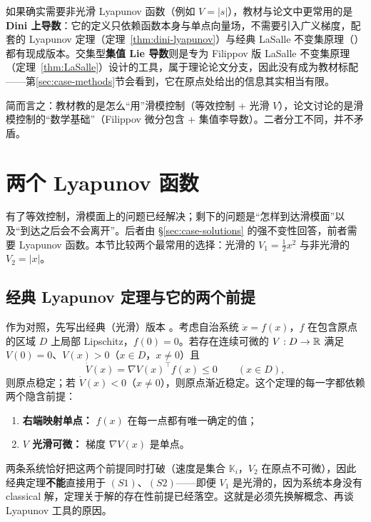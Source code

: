 如果确实需要非光滑 Lyapunov 函数（例如 $V=|s|$），教材与论文中更常用的是 \textbf{Dini 上导数}：它的定义只依赖函数本身与单点向量场，不需要引入广义梯度，配套的 Lyapunov 定理（定理~\ref{thm:dini-lyapunov}）与经典 LaSalle 不变集原理（\cite{roucheStabilityTheoryLiapunov1977}）都有现成版本。交集型\textbf{集值 Lie 导数}则是专为 Filippov 版 LaSalle 不变集原理（定理~\ref{thm:LaSalle}）设计的工具，属于理论论文分支，因此没有成为教材标配——第\ref{sec:case-methods}节会看到，它在原点处给出的信息其实相当有限。

简而言之：教材教的是怎么“用”滑模控制（等效控制 + 光滑 $V$），论文讨论的是滑模控制的“数学基础”（Filippov 微分包含 + 集值李导数）。二者分工不同，并不矛盾。

\section{两个 Lyapunov 函数}\label{sec:case-lyapunov}

有了等效控制，滑模面上的问题已经解决；剩下的问题是“怎样到达滑模面”以及“到达之后会不会离开”。后者由 \S\ref{sec:case-solutions} 的强不变性回答，前者需要 Lyapunov 函数。本节比较两个最常用的选择：光滑的 $V_1=\tfrac12x^2$ 与非光滑的 $V_2=|x|$。

\subsection{经典 Lyapunov 定理与它的两个前提}

作为对照，先写出经典（光滑）版本 \cite[Theorem 4.1]{khalilNonlinearSystems}。考虑自治系统 $\dot x=f(x)$，$f$ 在包含原点的区域 $D$ 上局部 Lipschitz，$f(0)=0$。若存在连续可微的 $V:D\to\mathbb{R}$ 满足 $V(0)=0$、$V(x)>0$（$x\in D$，$x\neq0$）且
\[
\dot V(x)=\nabla V(x)^\top f(x)\le0\qquad(x\in D),
\]
则原点稳定；若 $\dot V(x)<0$（$x\neq0$），则原点渐近稳定。这个定理的每一字都依赖两个隐含前提：

\begin{enumerate}
  \item \textbf{右端映射单点：} $f(x)$ 在每一点都有唯一确定的值；
  \item \textbf{$V$ 光滑可微：} 梯度 $\nabla V(x)$ 是单点。
\end{enumerate}

两条系统恰好把这两个前提同时打破（速度是集合 $\mathbb{K}_i$，$V_2$ 在原点不可微），因此经典定理\textbf{不能}直接用于 $(S1)$、$(S2)$——即便 $V_1$ 是光滑的，因为系统本身没有 classical 解，定理关于解的存在性前提已经落空。这就是必须先换解概念、再谈 Lyapunov 工具的原因。

